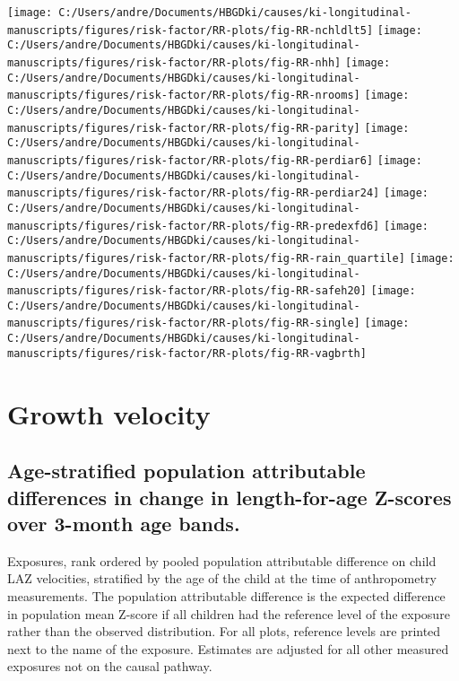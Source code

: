 \documentclass[
  9pt,
]{book}
\begin{document}
\texttt{[image: C:/Users/andre/Documents/HBGDki/causes/ki-longitudinal-manuscripts/figures/risk-factor/RR-plots/fig-RR-nchldlt5]}
\texttt{[image: C:/Users/andre/Documents/HBGDki/causes/ki-longitudinal-manuscripts/figures/risk-factor/RR-plots/fig-RR-nhh]}
\texttt{[image: C:/Users/andre/Documents/HBGDki/causes/ki-longitudinal-manuscripts/figures/risk-factor/RR-plots/fig-RR-nrooms]}
\texttt{[image: C:/Users/andre/Documents/HBGDki/causes/ki-longitudinal-manuscripts/figures/risk-factor/RR-plots/fig-RR-parity]}
\texttt{[image: C:/Users/andre/Documents/HBGDki/causes/ki-longitudinal-manuscripts/figures/risk-factor/RR-plots/fig-RR-perdiar6]}
\texttt{[image: C:/Users/andre/Documents/HBGDki/causes/ki-longitudinal-manuscripts/figures/risk-factor/RR-plots/fig-RR-perdiar24]}
\texttt{[image: C:/Users/andre/Documents/HBGDki/causes/ki-longitudinal-manuscripts/figures/risk-factor/RR-plots/fig-RR-predexfd6]}
\texttt{[image: C:/Users/andre/Documents/HBGDki/causes/ki-longitudinal-manuscripts/figures/risk-factor/RR-plots/fig-RR-rain\_quartile]}
\texttt{[image: C:/Users/andre/Documents/HBGDki/causes/ki-longitudinal-manuscripts/figures/risk-factor/RR-plots/fig-RR-safeh20]}
\texttt{[image: C:/Users/andre/Documents/HBGDki/causes/ki-longitudinal-manuscripts/figures/risk-factor/RR-plots/fig-RR-single]}
\texttt{[image: C:/Users/andre/Documents/HBGDki/causes/ki-longitudinal-manuscripts/figures/risk-factor/RR-plots/fig-RR-vagbrth]}

\hypertarget{velocity}{%
\chapter{Growth velocity}\label{velocity}}

\raggedright

\hypertarget{age-stratified-population-attributable-differences-in-change-in-length-for-age-z-scores-over-3-month-age-bands.}{%
\section{Age-stratified population attributable differences in change in length-for-age Z-scores over 3-month age bands.}\label{age-stratified-population-attributable-differences-in-change-in-length-for-age-z-scores-over-3-month-age-bands.}}

Exposures, rank ordered by pooled population attributable difference on child LAZ velocities, stratified by the age of the child at the time of anthropometry measurements. The population attributable difference is the expected difference in population mean Z-score if all children had the reference level of the exposure rather than the observed distribution. For all plots, reference levels are printed next to the name of the exposure. Estimates are adjusted for all other measured exposures not on the causal pathway.
\end{document}
